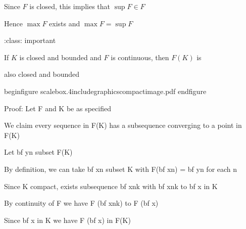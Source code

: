 \documentclass[letterpaper,10pt,english]{jupyterBook}
\begin{document}
\sphinxAtStartPar
Since \(F\) is closed, this implies that \(\sup F \in F\)

\sphinxAtStartPar
Hence \(\max F\) exists and \(\max F = \sup F\)

\sphinxAtStartPar
:class: important

\sphinxAtStartPar
If \(K\) is closed and bounded and \(F\) is continuous, then \(F(K)\) is

\begin{sphinxVerbatim}[commandchars=\\\{\}]
\PYGZpc{}also closed and bounded

\PYGZpc{}

\PYGZpc{}\PYGZbs{}begin\PYGZob{}figure\PYGZcb{}
\PYGZpc{}\PYGZbs{}scalebox\PYGZob{}.4\PYGZcb{}\PYGZob{}\PYGZbs{}includegraphics\PYGZob{}compact\PYGZus{}image.pdf\PYGZcb{}\PYGZcb{}
\PYGZpc{}\PYGZbs{}end\PYGZob{}figure\PYGZcb{}

\PYGZpc{}

\PYGZpc{}

\PYGZpc{}Proof: Let \PYGZdl{}F\PYGZdl{} and \PYGZdl{}K\PYGZdl{} be as specified

\PYGZpc{}

\PYGZpc{}We claim every sequence in \PYGZdl{}F(K)\PYGZdl{} has a subsequence converging
\PYGZpc{}to a point in \PYGZdl{}F(K)\PYGZdl{}

\PYGZpc{}

\PYGZpc{}Let \PYGZdl{}\PYGZbs{}\PYGZob{}\PYGZob{}\PYGZbs{}bf y\PYGZcb{}\PYGZus{}n\PYGZbs{}\PYGZcb{} \PYGZbs{}subset F(K)\PYGZdl{} 

\PYGZpc{}By definition, we can take \PYGZdl{}\PYGZbs{}\PYGZob{}\PYGZob{}\PYGZbs{}bf x\PYGZcb{}\PYGZus{}n\PYGZbs{}\PYGZcb{} \PYGZbs{}subset K\PYGZdl{} with \PYGZdl{}F(\PYGZob{}\PYGZbs{}bf x\PYGZcb{}\PYGZus{}n) = \PYGZob{}\PYGZbs{}bf y\PYGZcb{}\PYGZus{}n\PYGZdl{} for each \PYGZdl{}n\PYGZdl{}

\PYGZpc{}Since \PYGZdl{}K\PYGZdl{} compact, \PYGZdl{}\PYGZbs{}exists\PYGZdl{} subsequence \PYGZdl{}\PYGZbs{}\PYGZob{}\PYGZob{}\PYGZbs{}bf x\PYGZcb{}\PYGZus{}\PYGZob{}n\PYGZus{}k\PYGZcb{}\PYGZbs{}\PYGZcb{}\PYGZdl{} with \PYGZdl{}\PYGZob{}\PYGZbs{}bf x\PYGZcb{}\PYGZus{}\PYGZob{}n\PYGZus{}k\PYGZcb{} \PYGZbs{}to \PYGZob{}\PYGZbs{}bf x\PYGZcb{} \PYGZbs{}in K\PYGZdl{}

\PYGZpc{}By continuity of \PYGZdl{}F\PYGZdl{} we have \PYGZdl{}F (\PYGZob{}\PYGZbs{}bf x\PYGZcb{}\PYGZus{}\PYGZob{}n\PYGZus{}k\PYGZcb{}) \PYGZbs{}to F (\PYGZob{}\PYGZbs{}bf x\PYGZcb{})\PYGZdl{}

\PYGZpc{}Since \PYGZdl{}\PYGZob{}\PYGZbs{}bf x\PYGZcb{} \PYGZbs{}in K\PYGZdl{} we have \PYGZdl{}F (\PYGZob{}\PYGZbs{}bf x\PYGZcb{}) \PYGZbs{}in F(K)\PYGZdl{} 


\end{sphinxVerbatim}
\end{document}
